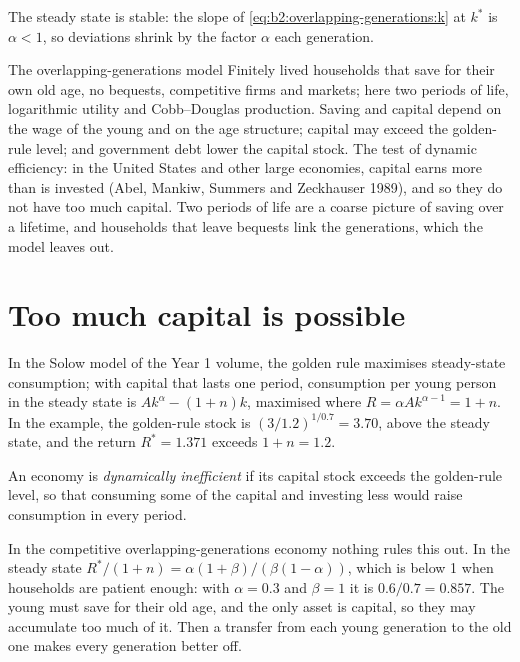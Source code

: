 The steady state is stable: the slope of \eqref{eq:b2:overlapping-generations:k} at $k^*$ is $\alpha < 1$, so deviations shrink by the factor $\alpha$ each generation.

\begin{model}{The overlapping-generations model}
\assumes Finitely lived households that save for their own old age, no bequests, competitive firms and markets; here two
periods of life, logarithmic utility and Cobb--Douglas production.
\predicts Saving and capital depend on the wage of the young and on the age structure; capital may exceed the golden-rule
level;  and government debt lower the capital stock.
\tested The test of dynamic efficiency: in the United States and other large economies, capital earns more than is
invested (Abel, Mankiw, Summers and Zeckhauser 1989), and so they do not have too much capital.
\breaks Two periods of life are a coarse picture of saving over a lifetime, and households that leave bequests link the
generations, which the model leaves out.
\end{model}

\section{Too much capital is possible}\label{sec:b2:overlapping-generations:inefficiency}

In the Solow model of the Year 1 volume, the golden rule maximises steady-state consumption; with capital that lasts one
period, consumption per young person in the steady state is $Ak^\alpha - (1 + n)k$, maximised where $R = \alpha Ak^{\alpha - 1} = 1 + n$. In the example, the golden-rule stock is $(3/1.2)^{1/0.7} = 3.70$, above the steady
state, and the return $R^* = 1.371$ exceeds $1 + n = 1.2$.

\begin{definition}\label{def:b2:overlapping-generations:dynamic-inefficiency}
An economy is \emph{dynamically inefficient} if its capital stock exceeds the golden-rule
level, so that consuming some of the capital and investing less would raise consumption in every period.
\end{definition}

In the competitive overlapping-generations economy nothing rules this out. In the steady state $R^*/(1 + n) = \alpha(1 + \beta)/(\beta(1 - \alpha))$, which is below 1 when households are
patient enough: with $\alpha = 0.3$ and $\beta = 1$ it is $0.6/0.7 = 0.857$. The young must save for their old age, and the only asset is capital, so they may accumulate too much of
it. Then a transfer from each young generation to the old one makes every generation better off.

